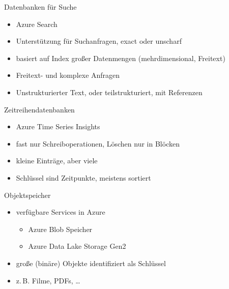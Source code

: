 \begin{flashcard}[Definition]{Datenbanken für Suche}
  \begin{itemize}
    \item Azure Search
    \item Unterstützung für Suchanfragen, exact oder unscharf
    \item basiert auf Index großer Datenmengen (mehrdimensional, Freitext)
    \item Freitext- und komplexe Anfragen
    \item Unstrukturierter Text, oder teilstrukturiert, mit Referenzen
  \end{itemize}
\end{flashcard}

\begin{flashcard}[Definition]{Zeitreihendatenbanken}
  \begin{itemize}
    \item Azure Time Series Insights
    \item fast nur Schreiboperationen, Löschen nur in Blöcken
    \item kleine Einträge, aber viele
    \item Schlüssel sind Zeitpunkte, meistens sortiert
  \end{itemize}
\end{flashcard}

\begin{flashcard}[Definition]{Objektspeicher}
  \begin{itemize}
    \item verfügbare Services in Azure
      \begin{itemize}
        \item Azure Blob Speicher
        \item Azure Data Lake Storage Gen2
      \end{itemize}
      \item große (binäre) Objekte identifiziert als Schlüssel
      \item z.\,B. Filme, PDFs, \ldots
  \end{itemize}
\end{flashcard}

